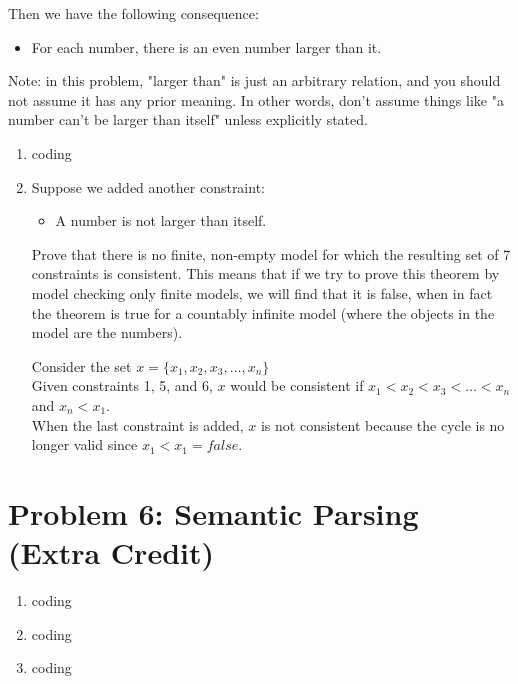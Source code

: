 \documentclass[10pt]{article}
\begin{document}
Then we have the following consequence:

\begin{itemize}
	\item For each number, there is an even number larger than it.
\end{itemize}

Note: in this problem, "larger than" is just an arbitrary relation, and you should not assume it has any prior meaning. In other words, don't assume things like "a number can't be larger than itself" unless explicitly stated.

\begin{enumerate}[label=(\alph*)]

  \item coding
  
  \item Suppose we added another constraint:
  \begin{itemize}
		\item A number is not larger than itself.
	\end{itemize}
	Prove that there is no finite, non-empty model for which the resulting set of 7 constraints is consistent. This means that if we try to prove this theorem by model checking only finite models, we will find that it is false, when in fact the theorem is true for a countably infinite model (where the objects in the model are the numbers).
	
	Consider the set $x = \{ x_1, x_2, x_3, \dots, x_n \}$\\
	Given constraints 1, 5, and 6, $x$ would be consistent if $x_1 < x_2 < x_3 < \dots < x_n$ and $x_n < x_1$.\\
	When the last constraint is added, $x$ is not consistent because the cycle is no longer valid since $x_1 < x_1 = false$.
  
\end{enumerate}

\section*{\normalsize Problem 6: Semantic Parsing (Extra Credit)}

\begin{enumerate}[label=(\alph*)]

  \item coding
  
  \item coding
  
  \item coding
  
\end{enumerate}
\end{document}
